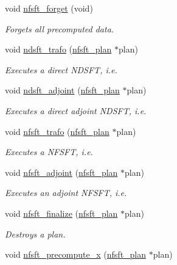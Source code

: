 \begin{CompactItemize}
void \hyperlink{group__nfsft_g3b69bca6c76a63877534f5a9781bf285}{nfsft\_\-forget} (void)
\begin{CompactList}\small\item\em Forgets all precomputed data. \item\end{CompactList}\item 
void \hyperlink{group__nfsft_gc1bcdf551a0bf1b4a5890b87e583caf8}{ndsft\_\-trafo} (\hyperlink{structnfsft__plan}{nfsft\_\-plan} $\ast$plan)
\begin{CompactList}\small\item\em Executes a direct NDSFT, i.e. \item\end{CompactList}\item 
void \hyperlink{group__nfsft_g88c7be3ead1c726a1d5b8b903952c527}{ndsft\_\-adjoint} (\hyperlink{structnfsft__plan}{nfsft\_\-plan} $\ast$plan)
\begin{CompactList}\small\item\em Executes a direct adjoint NDSFT, i.e. \item\end{CompactList}\item 
void \hyperlink{group__nfsft_g5796fc68c432d46dfcab7abd8c56ee22}{nfsft\_\-trafo} (\hyperlink{structnfsft__plan}{nfsft\_\-plan} $\ast$plan)
\begin{CompactList}\small\item\em Executes a NFSFT, i.e. \item\end{CompactList}\item 
void \hyperlink{group__nfsft_g813bb48d404c7286310733c99a81a169}{nfsft\_\-adjoint} (\hyperlink{structnfsft__plan}{nfsft\_\-plan} $\ast$plan)
\begin{CompactList}\small\item\em Executes an adjoint NFSFT, i.e. \item\end{CompactList}\item 
void \hyperlink{group__nfsft_ga63e193a27d84059742ff25ff81e2ed1}{nfsft\_\-finalize} (\hyperlink{structnfsft__plan}{nfsft\_\-plan} $\ast$plan)
\begin{CompactList}\small\item\em Destroys a plan. \item\end{CompactList}\item 
\hypertarget{group__nfsft_g7a7fa6722d6ba3aade4c69299af86e4e}{
void \hyperlink{group__nfsft_g7a7fa6722d6ba3aade4c69299af86e4e}{nfsft\_\-precompute\_\-x} (\hyperlink{structnfsft__plan}{nfsft\_\-plan} $\ast$plan)}
\label{group__nfsft_g7a7fa6722d6ba3aade4c69299af86e4e}


\end{CompactItemize}
